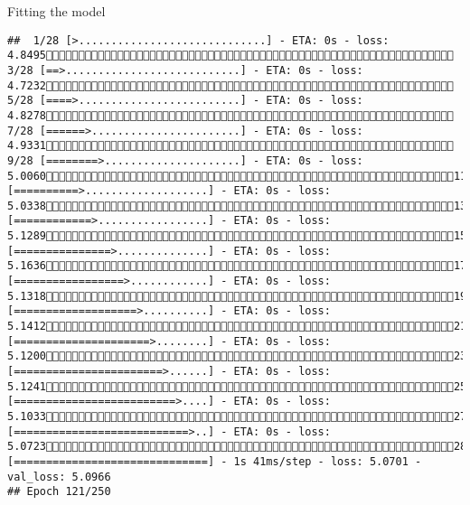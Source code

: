 \documentclass[
  ignorenonframetext,
]{beamer}
\begin{document}
\begin{frame}[fragile]{Fitting the model}
\begin{verbatim}
##  1/28 [>.............................] - ETA: 0s - loss: 4.8495 3/28 [==>...........................] - ETA: 0s - loss: 4.7232 5/28 [====>.........................] - ETA: 0s - loss: 4.8278 7/28 [======>.......................] - ETA: 0s - loss: 4.9331 9/28 [========>.....................] - ETA: 0s - loss: 5.006011/28 [==========>...................] - ETA: 0s - loss: 5.033813/28 [============>.................] - ETA: 0s - loss: 5.128915/28 [===============>..............] - ETA: 0s - loss: 5.163617/28 [=================>............] - ETA: 0s - loss: 5.131819/28 [===================>..........] - ETA: 0s - loss: 5.141221/28 [=====================>........] - ETA: 0s - loss: 5.120023/28 [=======================>......] - ETA: 0s - loss: 5.124125/28 [=========================>....] - ETA: 0s - loss: 5.103327/28 [===========================>..] - ETA: 0s - loss: 5.072328/28 [==============================] - 1s 41ms/step - loss: 5.0701 - val_loss: 5.0966
## Epoch 121/250

\end{verbatim}
\end{frame}
\end{document}
